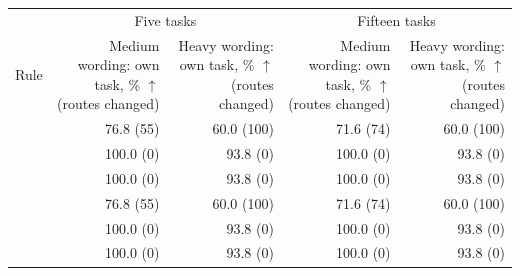 \begin{tabular}{lrrrr}
    \toprule
    & \multicolumn{2}{c}{Five tasks} & \multicolumn{2}{c}{Fifteen tasks} \\
    \cmidrule(lr){2-3} \cmidrule(lr){4-5}
    Rule & \shortstack[r]{Medium wording:\\own task, \% $\uparrow$\\(routes changed)} & \shortstack[r]{Heavy wording:\\own task, \% $\uparrow$\\(routes changed)} & \shortstack[r]{Medium wording:\\own task, \% $\uparrow$\\(routes changed)} & \shortstack[r]{Heavy wording:\\own task, \% $\uparrow$\\(routes changed)} \\
    \midrule
    \signature{} & 76.8 (55) & 60.0 (100) & 71.6 (74) & 60.0 (100) \\
    \nearest{} & 100.0 (0) & 93.8 (0) & 100.0 (0) & 93.8 (0) \\
    \cert{} & 100.0 (0) & 93.8 (0) & 100.0 (0) & 93.8 (0) \\
    \hybrid{} & 76.8 (55) & 60.0 (100) & 71.6 (74) & 60.0 (100) \\
    \scaled{} & 100.0 (0) & 93.8 (0) & 100.0 (0) & 93.8 (0) \\
    \certscaled{} & 100.0 (0) & 93.8 (0) & 100.0 (0) & 93.8 (0) \\
    \bottomrule
\end{tabular}
